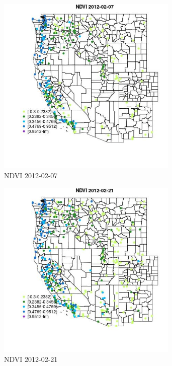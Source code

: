 \begin{figure} 
\centering  
\includegraphics[width=0.77\textwidth]{Code_Outputs/Report_ML_input_PM25_Step4_part_f_de_duplicated_aves_prioritize_24hr_obswNAs_MapObsNDVI2012-02-07.jpg} 
\caption{\label{fig:Report_ML_input_PM25_Step4_part_f_de_duplicated_aves_prioritize_24hr_obswNAsMapObsNDVI2012-02-07}NDVI 2012-02-07} 
\end{figure} 
 

\begin{figure} 
\centering  
\includegraphics[width=0.77\textwidth]{Code_Outputs/Report_ML_input_PM25_Step4_part_f_de_duplicated_aves_prioritize_24hr_obswNAs_MapObsNDVI2012-02-21.jpg} 
\caption{\label{fig:Report_ML_input_PM25_Step4_part_f_de_duplicated_aves_prioritize_24hr_obswNAsMapObsNDVI2012-02-21}NDVI 2012-02-21} 
\end{figure} 
 

